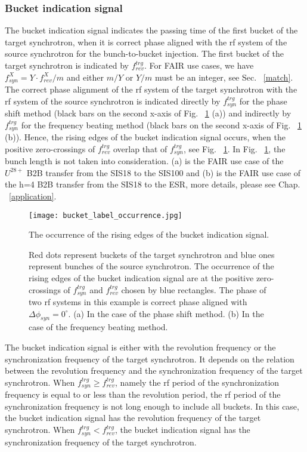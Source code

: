\subsubsection{Bucket indication signal}
The bucket indication signal indicates the passing time of the first bucket of the target synchrotron, when it is correct phase aligned with the rf system of the source synchrotron for the bunch-to-bucket injection. The first bucket of the target synchrotron is indicated by $f_{\mathit{rev}}^{trg}$. For FAIR use cases, we have $f_\mathit{syn}^{X}=Y\cdot f_\mathit{rev}^{X}/m$ and either $m/Y$ or $Y/m$ must be an integer, see Sec. ~\ref{match}. The correct phase alignment of the rf system of the target synchrotron with the rf system of the source synchrotron is indicated directly by $f_{\mathit{syn}}^{trg}$ for the phase shift method (black bars on the second x-axis of Fig. ~\ref{bucket_label_occurrence} (a)) and indirectly by $f_{\mathit{syn}}^{trg}$ for the frequency beating method (black bars on the second x-axis of Fig. ~\ref{bucket_label_occurrence} (b)). Hence, the rising edges of the bucket indication signal occurs, when the positive zero-crossings of $f_{\mathit{rev}}^{trg}$ overlap that of $f_{\mathit{syn}}^{trg}$, see Fig. ~\ref{bucket_label_occurrence}. In Fig. ~\ref{bucket_label_occurrence}, the bunch length is not taken into consideration. (a) is the FAIR use case of the $U^{28+}$ B2B transfer from the SIS18 to the SIS100 and (b) is the FAIR use case of the h=4 B2B transfer from the SIS18 to the ESR, more details, please see Chap. ~\ref{application}.
\begin{figure}[!htb]
   \centering   
   \texttt{[image: bucket\_label\_occurrence.jpg]}
   \caption{The occurrence of the rising edges of the bucket indication signal.}
	\caption*{Red dots represent buckets of the target synchrotron and blue ones represent bunches of the source synchrotron. The occurrence of the rising edges of the bucket indication signal are at the positive zero-crossings of $f_{\mathit{syn}}^{trg}$ and $f_{\mathit{rev}}^{trg}$ chosen by blue rectangles. The phase of two rf systems in this example is correct phase aligned with $\Delta\phi_\mathit{syn}=0^\circ$. (a) In the case of the phase shift method. (b) In the case of the frequency beating method.}
   \label{bucket_label_occurrence}
\end{figure}

The bucket indication signal is either with the revolution frequency or the synchronization frequency of the target synchrotron. It depends on the relation between the revolution frequency and the synchronization frequency of the target synchrotron. When $f_{\mathit{syn}}^{trg}\ge f_{\mathit{rev}}^{trg}$, namely the rf period of the synchronization frequency is equal to or less than the revolution period, the rf period of the synchronization frequency is not long enough to include all buckets. In this case, the bucket indication signal has the revolution frequency of the target synchrotron. When $f_{\mathit{syn}}^{trg}<f_{\mathit{rev}}^{trg}$, the bucket indication signal has the synchronization frequency of the target synchrotron. 

